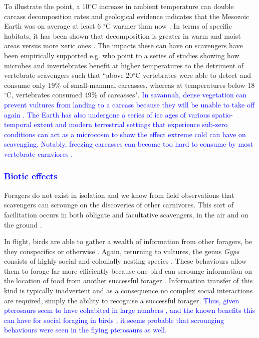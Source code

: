 \documentclass[a4paper,12pt]{article}
\begin{document}
To illustrate the point, a 10$^{\circ}$C increase in ambient temperature can double carcass decomposition rates \citep{parmenter2009carrion} and geological evidence indicates that the Mesozoic Earth was on average at least 6 $^{\circ}$C warmer than now \citep{sellwood2006mesozoic}.
In terms of specific habitats, it has been shown that decomposition is greater in warm and moist areas versus more xeric ones \citep{beasley2015vertebrates}.
The impacts these can have on scavengers have been empirically supported e.g. \cite{beasley2015vertebrates} who point to a series of studies showing how microbes and invertebrates benefit at higher temperatures to the detriment of vertebrate scavengers such that ``above 20$^{\circ}$C vertebrates were able to detect and consume only 19\% of small-mammal carcasses, whereas at temperatures below 18$^{\circ}$C, vertebrates consumed 49\% of carcasses".
\textcolor{blue}{In savannah, dense vegetation can prevent vultures from landing to a carcass because they will be unable to take off again \citep{bamford2009effect}.
The Earth has also undergone a series of ice ages of various spatio-temporal extent \citep{diedrich2012cave} and modern terrestrial settings that experience sub-zero conditions can act as a microcosm to show the effect extreme cold can have on scavenging.
Notably, freezing carcasses can become too hard to consume by most vertebrate carnviores \citep{selva2003scavenging}.}

\subsubsection{\textcolor{blue}{Biotic effects}}
Foragers do not exist in isolation and we know from field observations that scavengers can scrounge on the discoveries of other carnivores. 
This sort of facilitation occurs in both obligate and facultative scavengers, in the air and on the ground \citep{KaneVul,jones2015african}. 

In flight, birds are able to gather a wealth of information from other foragers, be they conspecifics or otherwise \textcolor{blue}{\citep{jackson2008effect,KaneVul,moleon2014inter}}.
Again, returning to vultures, the genus \textit{Gyps} consists of highly social and colonially nesting species \citep{fernandez2015density}.
These behaviours allow them to forage far more efficiently because one bird can scrounge information on the location of food from another successful forager \textcolor{blue}{\citep{cortes2014bird}}.
Information transfer of this kind is typically inadvertent and as a consequence no complex social interactions are required, simply the ability to recognise a successful forager.
\textcolor{blue}{Thus, given pterosaurs seem to have cohabited in large numbers \citep{witton2013pterosaurs}, and the known benefits this can have for social foraging in birds \citep{jackson2011evolutionary}, it seems probable that scrounging behaviours were seen in the flying pterosaurs as well.} 
\end{document}
